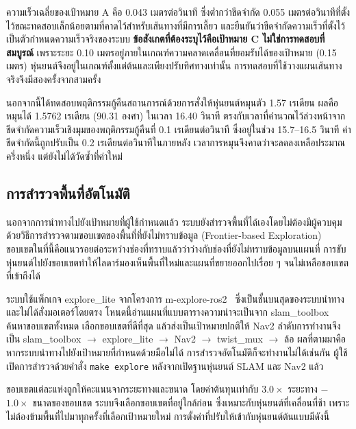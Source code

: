 \documentclass[a4paper,12pt]{report}
\begin{document}
ความเร็วเฉลี่ยของเป้าหมาย A คือ 0.043 เมตรต่อวินาที
ซึ่งต่ำกว่าขีดจำกัด 0.055 เมตรต่อวินาทีที่ตั้งไว้ขณะทดสอบเล็กน้อยตามที่คาดไว้สำหรับเส้นทางที่มีการเลี้ยว
และยืนยันว่าขีดจำกัดความเร็วที่ตั้งไว้เป็นตัวกำหนดความเร็วจริงของระบบ
\textbf{ข้อสังเกตที่ต้องระบุไว้คือเป้าหมาย C ไม่ใช่การทดสอบที่สมบูรณ์}
เพราะระยะ 0.10 เมตรอยู่ภายในเกณฑ์ความคลาดเคลื่อนที่ยอมรับได้ของเป้าหมาย (0.15 เมตร)
หุ่นยนต์จึงอยู่ในเกณฑ์ตั้งแต่ต้นและเพียงปรับทิศทางเท่านั้น
การทดสอบที่ใช้วางแผนเส้นทางจริงจึงมีสองครั้งจากสามครั้ง

นอกจากนี้ได้ทดสอบพฤติกรรมกู้คืนสถานการณ์ด้วยการสั่งให้หุ่นยนต์หมุนตัว 1.57 เรเดียน
ผลคือหมุนได้ 1.5762 เรเดียน (90.31 องศา) ในเวลา 16.40 วินาที
ตรงกับเวลาที่คำนวณไว้ล่วงหน้าจากขีดจำกัดความเร็วเชิงมุมของพฤติกรรมกู้คืนที่
0.1 เรเดียนต่อวินาที ซึ่งอยู่ในช่วง 15.7--16.5 วินาที
ค่าขีดจำกัดนี้ถูกปรับเป็น 0.2 เรเดียนต่อวินาทีในภายหลัง
เวลาการหมุนจึงคาดว่าจะลดลงเหลือประมาณครึ่งหนึ่ง แต่ยังไม่ได้วัดซ้ำที่ค่าใหม่

\subsection{การสำรวจพื้นที่อัตโนมัติ}
\label{sec:explore}

นอกจากการนำทางไปยังเป้าหมายที่ผู้ใช้กำหนดแล้ว ระบบยังสำรวจพื้นที่ได้เองโดยไม่ต้องมีผู้ควบคุม
ด้วยวิธีการสำรวจตามขอบเขตของพื้นที่ที่ยังไม่ทราบข้อมูล (Frontier-based Exploration)~\cite{yamauchi1997}
ขอบเขตในที่นี้คือแนวรอยต่อระหว่างช่องที่ทราบแล้วว่าว่างกับช่องที่ยังไม่ทราบข้อมูลบนแผนที่
การขับหุ่นยนต์ไปยังขอบเขตทำให้ไลดาร์มองเห็นพื้นที่ใหม่และแผนที่ขยายออกไปเรื่อย ๆ
จนไม่เหลือขอบเขตที่เข้าถึงได้

ระบบใช้แพ็กเกจ explore\_lite จากโครงการ m-explore-ros2~\cite{mexplore}
ซึ่งเป็นชั้นบนสุดของระบบนำทางและไม่ได้สั่งมอเตอร์โดยตรง
โหนดนี้อ่านแผนที่แบบตารางความน่าจะเป็นจาก slam\_toolbox
ค้นหาขอบเขตทั้งหมด เลือกขอบเขตที่ดีที่สุด แล้วส่งเป็นเป้าหมายปกติให้ Nav2
ลำดับการทำงานจึงเป็น slam\_toolbox $\rightarrow$ explore\_lite $\rightarrow$ Nav2 $\rightarrow$ twist\_mux $\rightarrow$ ล้อ
ผลที่ตามมาคือหากระบบนำทางไปยังเป้าหมายที่กำหนดด้วยมือไม่ได้ การสำรวจอัตโนมัติก็จะทำงานไม่ได้เช่นกัน
ผู้ใช้เปิดการสำรวจด้วยคำสั่ง \texttt{make explore} หลังจากเปิดฐานหุ่นยนต์ SLAM และ Nav2 แล้ว

ขอบเขตแต่ละแห่งถูกให้คะแนนจากระยะทางและขนาด
โดยค่าต้นทุนเท่ากับ $3.0 \times$ ระยะทาง $-$ $1.0 \times$ ขนาดของขอบเขต
ระบบจึงเลือกขอบเขตที่อยู่ใกล้ก่อน ซึ่งเหมาะกับหุ่นยนต์ที่เคลื่อนที่ช้า
เพราะไม่ต้องข้ามพื้นที่ไปมาทุกครั้งที่เลือกเป้าหมายใหม่
การตั้งค่าที่ปรับให้เข้ากับหุ่นยนต์ต้นแบบมีดังนี้
\end{document}
